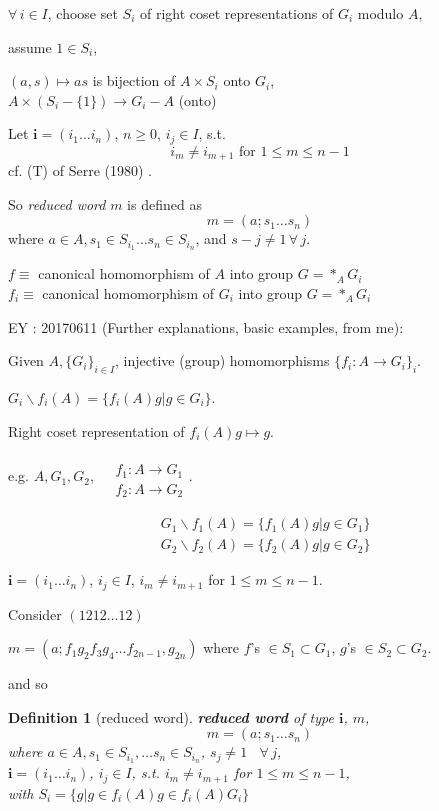 \documentclass[10pt]{amsart}
\newtheorem{definition}{Definition}
\begin{document}
\begin{multicols*}{2}
$\forall \, i \in I$, choose set $S_i$ of right coset representations of $G_i$ modulo $A$, 

assume $1 \in S_i$, 

$(a,s)\mapsto as$ is bijection of $A\times S_i$ onto $G_i$,  \\
$A\times (S_i-\lbrace 1 \rbrace) \to G_i-A$ (onto)

Let $\mathbf{i} = (i_1\dots i_n)$, $n\geq 0$, $i_j \in I$, s.t. 
\begin{equation}
i_m \neq i_{m+1} \text{ for } 1 \leq m \leq n-1
\end{equation}
cf. (T) of Serre (1980) \cite{Serr1980}.  

So \emph{reduced word} $m$ is defined as 
\[
m = (a;s_1\dots s_n)
\]
where $a\in A, s_1\in S_{i_1} \dots s_n \in S_{i_n}$, and $s-j \neq 1\, \forall \, j$.  

$f\equiv $ canonical homomorphism of $A$ into group $G= *_A G_i$ \\ 
$f_i \equiv $ canonical homomorphism of $G_i$ into group $G= *_A G_i$

EY : 20170611 (Further explanations, basic examples, from me):  

Given $A, \lbrace G_i\rbrace_{i\in I}$, injective (group) homomorphisms $\lbrace f_i: A \to G_i\rbrace_i$.  

$G_i \backslash f_i(A) = \lbrace f_i(A)g | g\in G_i\rbrace$.  

Right coset representation of $f_i(A)g\mapsto g$.  

e.g. $A,G_1,G_2$, $\begin{aligned} & \quad \\
	& f_1:A \to G_1 \\
		& f_2 : A\to G_2 \end{aligned}$.  
		
	\[
	\begin{aligned}
	& G_1\backslash f_1(A) = \lbrace f_1(A)g| g\in G_1\rbrace \\
	& G_2\backslash f_2(A) = \lbrace f_2(A)g | g\in G_2 \rbrace
	\end{aligned}
	\]

$\mathbf{i} = (i_1\dots i_n)$, $i_j\in I$, $i_m\neq i_{m+1}$ for $1\leq m \leq n-1$.  

Consider $(1212\dots 12)$  

$m=(a;f_1 g_2 f_3 g_4 \dots f_{2n-1}, g_{2n})$ where $f$'s $\in S_1 \subset G_1$, $g$'s $\in S_2 \subset G_2$.  

and so 
\begin{definition}[reduced word]
	\textbf{reduced word} of type $\mathbf{i}$, $m$, \begin{equation}
	m=(a;s_1\dots s_n)
	\end{equation}
	where $a\in A, s_1 \in S_{i_1}, \dots s_n \in S_{i_n}$, $s_j\neq 1$ \, $\forall \, j$, \\
	\phantom{where } $\mathbf{i} = (i_1\dots i_n)$, $i_j \in I$, s.t. $i_m \neq i_{m+1}$ for $1\leq m \leq n-1$, \\
	with $S_i = \lbrace g | g\in f_i(A)g \in f_i(A) G_i\rbrace$  
\end{definition}





\end{multicols*}
\end{document}

